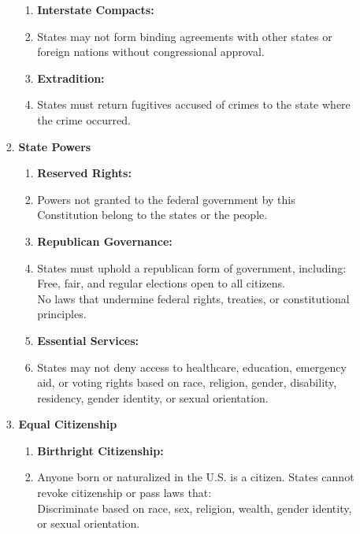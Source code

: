 \documentclass{article}
\begin{document}
\begin{multicols}{2}
\begin{enumerate}[label=\Alph*)]
\begin{enumerate}[label=\Alph*), start=4]
\begin{enumerate}[label=\Alph*), start=8]
\begin{enumerate}[label=3.2.\arabic*]
        \item[] \textbf{Interstate Compacts:}
        \item States may not form binding agreements with other states or foreign nations without congressional approval.
        
        \item[] \textbf{Extradition:}
        \item States must return fugitives accused of crimes to the state where the crime occurred.
    \end{enumerate}
    
    \item \textbf{State Powers}
    
    \begin{enumerate}[label=3.3.\arabic*]
        \item[] \textbf{Reserved Rights:}
        \item Powers not granted to the federal government by this Constitution belong to the states or the people.
        
        \item[] \textbf{Republican Governance:}
        \item States must uphold a republican form of government, including: \\
        Free, fair, and regular elections open to all citizens. \\
        No laws that undermine federal rights, treaties, or constitutional principles.
        
        \item[] \textbf{Essential Services:}
        \item States may not deny access to healthcare, education, emergency aid, or voting rights based on race, religion, gender, disability, residency, gender identity, or sexual orientation.
    \end{enumerate}
    
    \item \textbf{Equal Citizenship}
    
    \begin{enumerate}[label=3.4.\arabic*]
        \item[] \textbf{Birthright Citizenship:}
        \item Anyone born or naturalized in the U.S. is a citizen. States cannot revoke citizenship or pass laws that: \\
        Discriminate based on race, sex, religion, wealth, gender identity, or sexual orientation.
        

\end{enumerate}
\end{enumerate}
\end{enumerate}
\end{enumerate}
\end{multicols}
\end{document}

